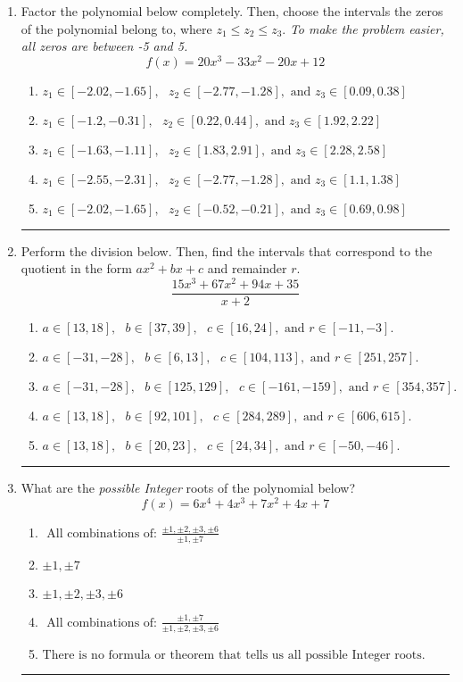 \documentclass[14pt]{extbook}
\newcommand{\litem}[1]{\item#1\hspace*{-1cm}\rule{\textwidth}{0.4pt}}
\begin{document}
\begin{enumerate}
{\begin{enumerate}[label=\Alph*.]
\end{enumerate} }
\litem{
Factor the polynomial below completely. Then, choose the intervals the zeros of the polynomial belong to, where $z_1 \leq z_2 \leq z_3$. \textit{To make the problem easier, all zeros are between -5 and 5.}\[ f(x) = 20x^{3} -33 x^{2} -20 x + 12 \]\begin{enumerate}[label=\Alph*.]
\item \( z_1 \in [-2.02, -1.65], \text{   }  z_2 \in [-2.77, -1.28], \text{   and   } z_3 \in [0.09, 0.38] \)
\item \( z_1 \in [-1.2, -0.31], \text{   }  z_2 \in [0.22, 0.44], \text{   and   } z_3 \in [1.92, 2.22] \)
\item \( z_1 \in [-1.63, -1.11], \text{   }  z_2 \in [1.83, 2.91], \text{   and   } z_3 \in [2.28, 2.58] \)
\item \( z_1 \in [-2.55, -2.31], \text{   }  z_2 \in [-2.77, -1.28], \text{   and   } z_3 \in [1.1, 1.38] \)
\item \( z_1 \in [-2.02, -1.65], \text{   }  z_2 \in [-0.52, -0.21], \text{   and   } z_3 \in [0.69, 0.98] \)

\end{enumerate} }
\litem{
Perform the division below. Then, find the intervals that correspond to the quotient in the form $ax^2+bx+c$ and remainder $r$.\[ \frac{15x^{3} +67 x^{2} +94 x + 35}{x + 2} \]\begin{enumerate}[label=\Alph*.]
\item \( a \in [13, 18], \text{   } b \in [37, 39], \text{   } c \in [16, 24], \text{   and   } r \in [-11, -3]. \)
\item \( a \in [-31, -28], \text{   } b \in [6, 13], \text{   } c \in [104, 113], \text{   and   } r \in [251, 257]. \)
\item \( a \in [-31, -28], \text{   } b \in [125, 129], \text{   } c \in [-161, -159], \text{   and   } r \in [354, 357]. \)
\item \( a \in [13, 18], \text{   } b \in [92, 101], \text{   } c \in [284, 289], \text{   and   } r \in [606, 615]. \)
\item \( a \in [13, 18], \text{   } b \in [20, 23], \text{   } c \in [24, 34], \text{   and   } r \in [-50, -46]. \)

\end{enumerate} }
\litem{
What are the \textit{possible Integer} roots of the polynomial below?\[ f(x) = 6x^{4} +4 x^{3} +7 x^{2} +4 x + 7 \]\begin{enumerate}[label=\Alph*.]
\item \( \text{ All combinations of: }\frac{\pm 1,\pm 2,\pm 3,\pm 6}{\pm 1,\pm 7} \)
\item \( \pm 1,\pm 7 \)
\item \( \pm 1,\pm 2,\pm 3,\pm 6 \)
\item \( \text{ All combinations of: }\frac{\pm 1,\pm 7}{\pm 1,\pm 2,\pm 3,\pm 6} \)
\item \( \text{There is no formula or theorem that tells us all possible Integer roots.} \)

\end{enumerate} }
\end{enumerate}
\end{document}
